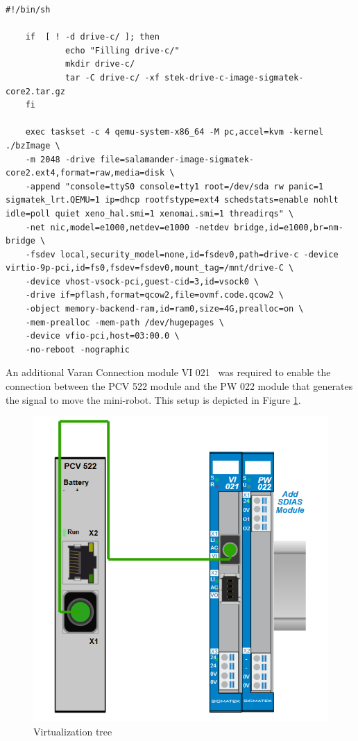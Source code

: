 \documentclass[MMR,Master,english]{twbook}
\begin{document}
\vspace{1em}
\begin{minipage}{\linewidth}
	\begin{lstlisting}[name={Include PCI in QEMU script for Salamander 4 virtualization},label={script:qemu_def_pci}]
	#!/bin/sh

	if  [ ! -d drive-c/ ]; then
			echo "Filling drive-c/"
			mkdir drive-c/
			tar -C drive-c/ -xf stek-drive-c-image-sigmatek-core2.tar.gz
	fi
		
	exec taskset -c 4 qemu-system-x86_64 -M pc,accel=kvm -kernel ./bzImage \
	-m 2048 -drive file=salamander-image-sigmatek-core2.ext4,format=raw,media=disk \
	-append "console=ttyS0 console=tty1 root=/dev/sda rw panic=1 sigmatek_lrt.QEMU=1 ip=dhcp rootfstype=ext4 schedstats=enable nohlt idle=poll quiet xeno_hal.smi=1 xenomai.smi=1 threadirqs" \
	-net nic,model=e1000,netdev=e1000 -netdev bridge,id=e1000,br=nm-bridge \
	-fsdev local,security_model=none,id=fsdev0,path=drive-c -device virtio-9p-pci,id=fs0,fsdev=fsdev0,mount_tag=/mnt/drive-C \
	-device vhost-vsock-pci,guest-cid=3,id=vsock0 \
	-drive if=pflash,format=qcow2,file=ovmf.code.qcow2 \
	-object memory-backend-ram,id=ram0,size=4G,prealloc=on \
	-mem-prealloc -mem-path /dev/hugepages \
	-device vfio-pci,host=03:00.0 \
	-no-reboot -nographic
\end{lstlisting}
\end{minipage}

\noindent An additional Varan Connection module VI 021~\cite{InterfacesSplittersSIGMATEK} was required to enable the connection between the PCV 522 module and the PW 022 module that generates the signal to move the mini-robot. This setup is depicted in Figure \ref{fig:virt_tree}.

\begin{figure}[H]
	\centering
	\includegraphics[width=0.5\columnwidth]{img/experiment/virt_tree.png}
	\caption[Virtualization tree]{Virtualization tree}
	\label{fig:virt_tree}
\end{figure}
\end{document}
